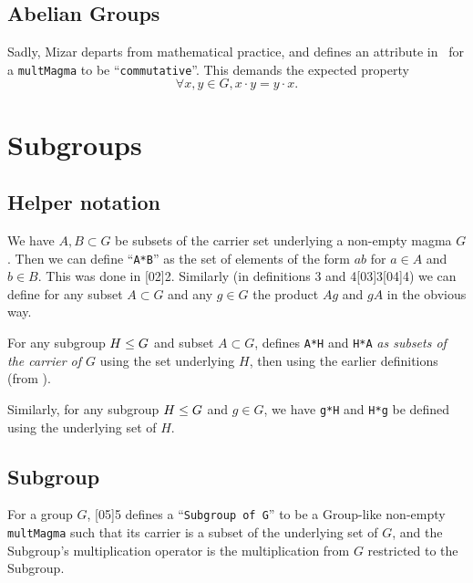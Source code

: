 \subsection{Abelian Groups}
Sadly, Mizar departs from mathematical practice, and defines an
attribute in~ for a \verb#multMagma# to be
``\verb#commutative#''.
This demands the expected property
\begin{equation*}
  \forall x,y\in G, x\cdot y=y\cdot x.
\end{equation*}

\section{Subgroups}

\subsection{Helper notation}
We have $A,B\subset G$ be subsets of the carrier set underlying a
non-empty magma $G$. Then we can define ``\verb#A*B#'' as the set of
elements of the form $ab$ for $a\in A$ and $b\in B$. This was done in
[02]{2}. Similarly (in definitions
3 and 4[03]{3}[04]{4}) we can define
for any subset $A\subset G$ and any $g\in G$ the product $Ag$ and $gA$
in the obvious way.

For any subgroup $H\leq G$ and subset $A\subset G$,
 defines \verb$A*H$ and
\verb$H*A$ \emph{as subsets of the carrier of $G$} using the set
underlying $H$, then using the earlier definitions (from
).

Similarly, for any subgroup $H\leq G$ and $g\in G$, we have
\verb#g*H# and \verb#H*g# be defined using the underlying set of $H$.

\subsection{Subgroup}
For a group $G$, [05]{5} defines a
``\verb#Subgroup of G#'' to be a Group-like non-empty \verb#multMagma#
such that its carrier is a subset of the underlying set of $G$, and the
Subgroup's multiplication operator is the multiplication from $G$
restricted to the Subgroup.

